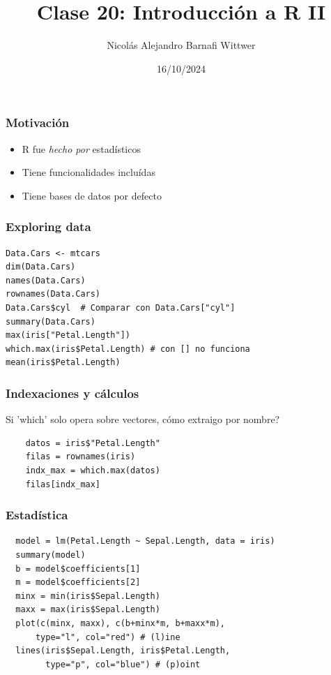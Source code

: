 \documentclass[14pt,aspectratio=169,xcolor=dvipsnames]{beamer}
\title[short title]{Clase 20: Introducción a R II}
\subtitle{}
\author[NA Barnafi] {Nicolás Alejandro Barnafi Wittwer}
\institute[UC|CMM] 
{
    Pontificia Universidad Católica de Chile \\
    Centro de Modelamiento Matemático
}
\date{16/10/2024}
\begin{document}
\begin{frame}
    \maketitle
\end{frame}
\begin{frame}\frametitle{Motivación}
    \begin{itemize}
        \item R fue \emph{hecho por} estadísticos
        \item Tiene funcionalidades incluídas
        \item Tiene bases de datos por defecto
    \end{itemize}
    
\end{frame}
\begin{frame}[fragile]\frametitle{Exploring data}
    \begin{verbatim}
Data.Cars <- mtcars 
dim(Data.Cars)
names(Data.Cars) 
rownames(Data.Cars)
Data.Cars$cyl  # Comparar con Data.Cars["cyl"]
summary(Data.Cars)
max(iris["Petal.Length"]) 
which.max(iris$Petal.Length) # con [] no funciona
mean(iris$Petal.Length)
    \end{verbatim}
\end{frame}
\begin{frame}[fragile]\frametitle{Indexaciones y cálculos}
Si 'which' solo opera sobre vectores, cómo extraigo por nombre? \pause

    \begin{verbatim}  
    datos = iris$"Petal.Length"
    filas = rownames(iris)
    indx_max = which.max(datos)
    filas[indx_max]
    \end{verbatim}
\end{frame}
\begin{frame}[fragile]\frametitle{Estadística}
    \begin{small}
\begin{verbatim}
  model = lm(Petal.Length ~ Sepal.Length, data = iris)
  summary(model)
  b = model$coefficients[1]
  m = model$coefficients[2]
  minx = min(iris$Sepal.Length)
  maxx = max(iris$Sepal.Length)
  plot(c(minx, maxx), c(b+minx*m, b+maxx*m), 
      type="l", col="red") # (l)ine
  lines(iris$Sepal.Length, iris$Petal.Length, 
        type="p", col="blue") # (p)oint
\end{verbatim}
    \end{small}
\end{frame}
\end{document}
